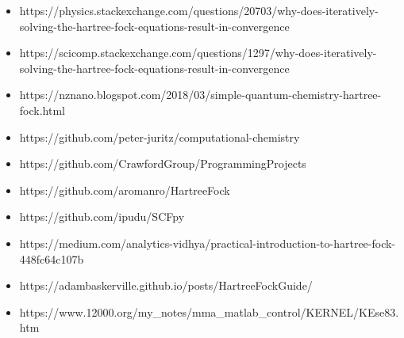 \documentclass[10pt, oneside, letterpaper]{article}
\begin{document}
\begin{itemize}
  \item https://physics.stackexchange.com/questions/20703/why-does-iteratively-solving-the-hartree-fock-equations-result-in-convergence
  \item https://scicomp.stackexchange.com/questions/1297/why-does-iteratively-solving-the-hartree-fock-equations-result-in-convergence
  \item https://nznano.blogspot.com/2018/03/simple-quantum-chemistry-hartree-fock.html %
  \item https://github.com/peter-juritz/computational-chemistry
  \item https://github.com/CrawfordGroup/ProgrammingProjects
  \item https://github.com/aromanro/HartreeFock
  \item https://github.com/ipudu/SCFpy %
  \item https://medium.com/analytics-vidhya/practical-introduction-to-hartree-fock-448fc64c107b %
  \item https://adambaskerville.github.io/posts/HartreeFockGuide/ %
  \item https://www.12000.org/my_notes/mma_matlab_control/KERNEL/KEse83.htm %
\end{itemize}
\end{document}

